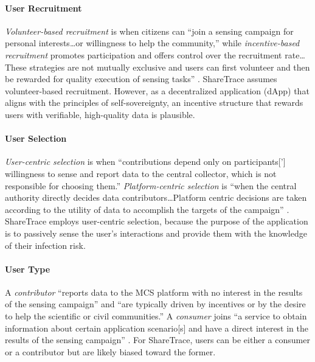 \paragraph{User Recruitment}

\emph{Volunteer-based recruitment} is when citizens can ``join a sensing campaign for personal interests{\ldots}or willingness to help the community,'' while \emph{incentive-based recruitment} promotes participation and offers control over the recruitment rate{\ldots}These strategies are not mutually exclusive and users can first volunteer and then be rewarded for quality execution of sensing tasks'' \cite{Capponi2019}. ShareTrace assumes volunteer-based recruitment. However, as a decentralized application (dApp) that aligns with the principles of self-sovereignty, an incentive structure that rewards users with verifiable, high-quality data is plausible.

\paragraph{User Selection}

\emph{User-centric selection} is when ``contributions depend only on participants['] willingness to sense and report data to the central collector, which is not responsible for choosing them.'' \emph{Platform-centric selection} is ``when the central authority directly decides data contributors{\ldots}Platform centric decisions are taken according to the utility of data to accomplish the targets of the campaign'' \cite{Capponi2019}. ShareTrace employs user-centric selection, because the purpose of the application is to passively sense the user's interactions and provide them with the knowledge of their infection risk.

\paragraph{User Type}

A \emph{contributor} ``reports data to the MCS platform with no interest in the results of the sensing campaign'' and ``are typically driven by incentives or by the desire to help the scientific or civil communities.'' A \emph{consumer} joins ``a service to obtain information about certain application scenario[s] and have a direct interest in the results of the sensing campaign'' \cite{Capponi2019}. For ShareTrace, users can be either a consumer or a contributor but are likely biased toward the former.

